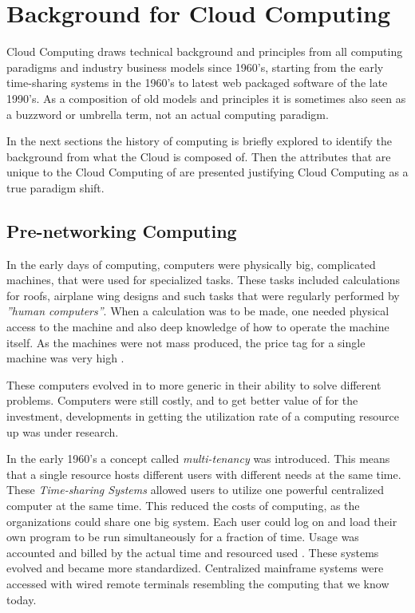 \documentclass{tktltiki}
\begin{document}
\section{Background for Cloud Computing}

Cloud Computing draws technical background and principles from all computing paradigms and industry business models since 1960's, starting from the early time-sharing systems in the 1960's to latest web packaged software of the late 1990's.  As a composition of old models and principles it is sometimes also seen as a buzzword or umbrella term, not an actual computing paradigm.

In the next sections the history of computing is briefly explored to identify the background from what the Cloud is composed of.  Then the attributes that are unique to the Cloud Computing of are presented justifying Cloud Computing as a true paradigm shift.
        
      
      

\subsection{Pre-networking Computing}
In the early days of computing, computers were physically big, complicated machines, that were used for specialized tasks.  These tasks included calculations for roofs, airplane wing designs and such tasks that were regularly performed by \emph{''human computers''}.  When a calculation was to be made, one needed physical access to the machine and also deep knowledge of how to operate the machine itself.  As the machines were not mass produced, the price tag for a single machine was very high \cite{zuse}.

These computers evolved in to more generic in their ability to solve different problems.  Computers were still costly, and to get better value of for the investment, developments in getting the utilization rate of a computing resource up was under research.

In the early 1960's a concept called \emph{multi-tenancy} was introduced.  This means that a single resource hosts different users with different needs at the same time.  These \emph{Time-sharing Systems} allowed users to utilize one powerful centralized computer at the same time.   This reduced the costs of computing, as the organizations could share one big system.  Each user could log on and load their own program to be run simultaneously for a fraction of time.  Usage was accounted and billed by the actual time and resourced used \cite{TimeSharing64}.  These systems evolved and became more standardized.  Centralized mainframe systems were accessed with wired remote terminals resembling the computing that we know today.
\end{document}
